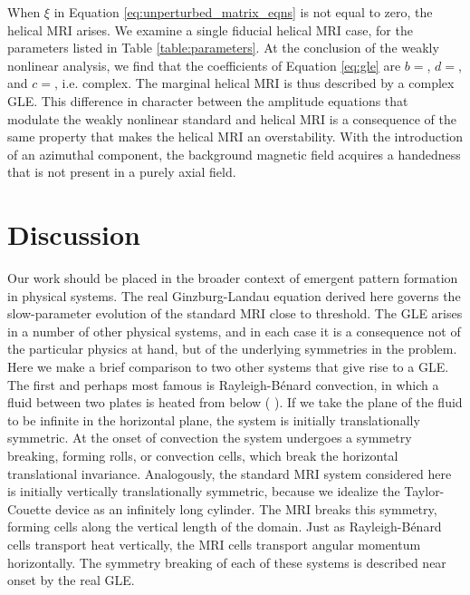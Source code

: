 \documentclass{emulateapj}
\newcommand{\citei}[1]{\citeauthor{#1} \citeyear{#1}}
\begin{document}
When $\xi$ in Equation \ref{eq:unperturbed_matrix_eqns} is not equal to zero, the helical MRI arises. We examine a single fiducial helical MRI case, for the parameters listed in Table \ref{table:parameters}. At the conclusion of the weakly nonlinear analysis, we find that the coefficients of Equation \ref{eq:gle} are $b = $, $d = $, and $c = $, i.e. complex. The marginal helical MRI is thus described by a complex GLE. This difference in character between the amplitude equations that modulate the weakly nonlinear standard and helical MRI is a consequence of the same property that makes the helical MRI an overstability. With the introduction of an azimuthal component, the background magnetic field acquires a handedness that is not present in a purely axial field.

\section{Discussion}

Our work should be placed in the broader context of emergent pattern formation in physical systems. The real Ginzburg-Landau equation derived here governs the slow-parameter evolution of the standard MRI close to threshold. The GLE arises in a number of other physical systems, and in each case it is a consequence not of the particular physics at hand, but of the underlying symmetries in the problem. Here we make a brief comparison to two other systems that give rise to a GLE. The first and perhaps most famous is Rayleigh-B\'enard convection, in which a fluid between two plates is heated from below (\citei{Newell:1969wr}). If we take the plane of the fluid to be infinite in the horizontal plane, the system is initially translationally symmetric. %
At the onset of convection the system undergoes a symmetry breaking, forming rolls, or convection cells, which break the horizontal translational invariance. Analogously, the standard MRI system considered here is initially vertically translationally symmetric, because we idealize the Taylor-Couette device as an infinitely long cylinder. The MRI breaks this symmetry, forming cells along the vertical length of the domain. Just as Rayleigh-B\'enard cells transport heat vertically, the MRI cells transport angular momentum horizontally. The symmetry breaking of each of these systems is described near onset by the real GLE. 
\end{document}
